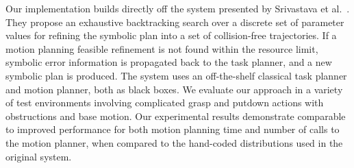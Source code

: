 Our implementation builds directly off the system presented by Srivastava et al.~\cite{srivastava2014combined}.
They propose an exhaustive backtracking search over a discrete set of parameter values for refining
the symbolic plan into a set of collision-free trajectories.
If a motion planning feasible refinement is not found within the resource limit,
symbolic error information is propagated back to the task planner, and a new symbolic plan is produced.
The system uses an off-the-shelf classical task planner and motion planner, both as black boxes.
We evaluate our approach in a variety of test environments involving complicated grasp and putdown
actions with obstructions and base motion. Our experimental results demonstrate
comparable to improved performance for both motion planning time and number of calls to
the motion planner, when compared to the hand-coded distributions used in the original system.